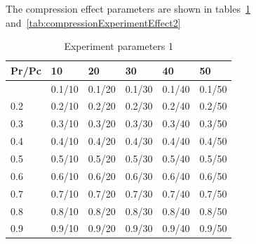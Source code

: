 \documentclass[12pt,a4paper]{IEEEtran}
\begin{document}
The compression effect parameters are shown in tables~\ref{tab:compressionExperimentEffect1} and~\ref{tab:compressionExperimentEffect2}

\begin{table}[ht]
	\centering
	\tiny
\begin{tabular}{ | >{\columncolor[HTML]{000000}}l | l | l | l | l | l | }
	\hline
	\rowcolor[HTML]{000000} 
	{\color[HTML]{FFFFFF} Pr/Pc} & {\color[HTML]{FFFFFF}10} & {\color[HTML]{FFFFFF}20} & {\color[HTML]{FFFFFF}30} & {\color[HTML]{FFFFFF}40} & {\color[HTML]{FFFFFF}50} \\ \hline
	    {\color[HTML]{FFFFFF}0.1} & 0.1/10 & 0.1/20 & 0.1/30 & 0.1/40 & 0.1/50  \\ \hline
		{\color[HTML]{FFFFFF}0.2} & 0.2/10 & 0.2/20 & 0.2/30 & 0.2/40 & 0.2/50  \\ \hline
		{\color[HTML]{FFFFFF}0.3} & 0.3/10 & 0.3/20 & 0.3/30 & 0.3/40 & 0.3/50  \\ \hline
		{\color[HTML]{FFFFFF}0.4} & 0.4/10 & 0.4/20 & 0.4/30 & 0.4/40 & 0.4/50  \\ \hline
		{\color[HTML]{FFFFFF}0.5} & 0.5/10 & 0.5/20 & 0.5/30 & 0.5/40 & 0.5/50  \\ \hline
		{\color[HTML]{FFFFFF}0.6} & 0.6/10 & 0.6/20 & 0.6/30 & 0.6/40 & 0.6/50  \\ \hline
		{\color[HTML]{FFFFFF}0.7} & 0.7/10 & 0.7/20 & 0.7/30 & 0.7/40 & 0.7/50  \\ \hline
		{\color[HTML]{FFFFFF}0.8} & 0.8/10 & 0.8/20 & 0.8/30 & 0.8/40 & 0.8/50  \\ \hline
		{\color[HTML]{FFFFFF}0.9} & 0.9/10 & 0.9/20 & 0.9/30 & 0.9/40 & 0.9/50  \\ \hline
	\end{tabular}
	\caption{Experiment parameters 1}
	\label{tab:compressionExperimentEffect1}
\end{table}
\end{document}
